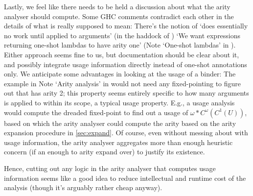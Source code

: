 Lastly, we feel like there needs to be held a discussion about what the arity analyser should compute.
Some GHC comments contradict each other in the details of what  is really supposed to mean:
There's the notion of `does essentially no work until applied to  arguments' (in the haddock of ) \vs `We want expressions returning one-shot lambdas to have arity one' (Note `One-shot lambdas' in ).
Either approach seems fine to us, but documentation should be clear about it, and possibly integrate usage information directly instead of one-shot annotations only.
We anticipate some advantages in looking at the usage of a binder:
The example in Note `Arity analysis' in  would not need any fixed-pointing to figure out that  has arity 2; this property seems entirely specific to how many arguments  is applied to within its scope, a typical usage property.
E.g., a usage analysis would compute the dreaded fixed-point to find out a usage of $\omega*C^\omega(C^1(U))$, based on which the arity analyser could compute the arity based on the arity expansion procedure in \cref{sec:expand}.
Of course, even without messing about with usage information, the arity analyser aggregates more than enough heuristic concern (\eg if an  enough to arity expand over) to justify its existence.

Hence, cutting out any logic in the arity analyser that computes usage information seems like a good idea to reduce intellectual and runtime cost of the analysis (though it's arguably rather cheap anyway).

